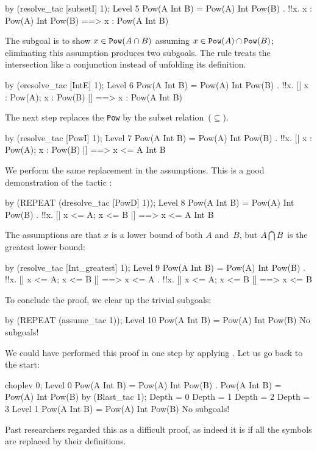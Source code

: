 \begin{ttbox}
by (resolve_tac [subsetI] 1);
{\out Level 5}
{\out Pow(A Int B) = Pow(A) Int Pow(B)}
{. !!x. x : Pow(A) Int Pow(B) ==> x : Pow(A Int B)}
\end{ttbox}
The subgoal is to show $x\in {\tt Pow}(A\cap B)$ assuming $x\in{\tt
Pow}(A)\cap {\tt Pow}(B)$; eliminating this assumption produces two
subgoals.  The rule  treats the intersection like a conjunction
instead of unfolding its definition.
\begin{ttbox}
by (eresolve_tac [IntE] 1);
{\out Level 6}
{\out Pow(A Int B) = Pow(A) Int Pow(B)}
{. !!x. [| x : Pow(A); x : Pow(B) |] ==> x : Pow(A Int B)}
\end{ttbox}
The next step replaces the {\tt Pow} by the subset
relation~($\subseteq$).
\begin{ttbox}
by (resolve_tac [PowI] 1);
{\out Level 7}
{\out Pow(A Int B) = Pow(A) Int Pow(B)}
{. !!x. [| x : Pow(A); x : Pow(B) |] ==> x <= A Int B}
\end{ttbox}
We perform the same replacement in the assumptions.  This is a good
demonstration of the tactic :
\begin{ttbox}
by (REPEAT (dresolve_tac [PowD] 1));
{\out Level 8}
{\out Pow(A Int B) = Pow(A) Int Pow(B)}
{. !!x. [| x <= A; x <= B |] ==> x <= A Int B}
\end{ttbox}
The assumptions are that $x$ is a lower bound of both $A$ and~$B$, but
$A\bigcap B$ is the greatest lower bound:
\begin{ttbox}
by (resolve_tac [Int_greatest] 1);
{\out Level 9}
{\out Pow(A Int B) = Pow(A) Int Pow(B)}
{. !!x. [| x <= A; x <= B |] ==> x <= A}
{. !!x. [| x <= A; x <= B |] ==> x <= B}
\end{ttbox}
To conclude the proof, we clear up the trivial subgoals:
\begin{ttbox}
by (REPEAT (assume_tac 1));
{\out Level 10}
{\out Pow(A Int B) = Pow(A) Int Pow(B)}
{\out No subgoals!}
\end{ttbox}
\medskip
We could have performed this proof in one step by applying
.  Let us
go back to the start:
\begin{ttbox}
choplev 0;
{\out Level 0}
{\out Pow(A Int B) = Pow(A) Int Pow(B)}
{. Pow(A Int B) = Pow(A) Int Pow(B)}
by (Blast_tac 1);
{\out Depth = 0}
{\out Depth = 1}
{\out Depth = 2}
{\out Depth = 3}
{\out Level 1}
{\out Pow(A Int B) = Pow(A) Int Pow(B)}
{\out No subgoals!}
\end{ttbox}
Past researchers regarded this as a difficult proof, as indeed it is if all
the symbols are replaced by their definitions.
\goodbreak

